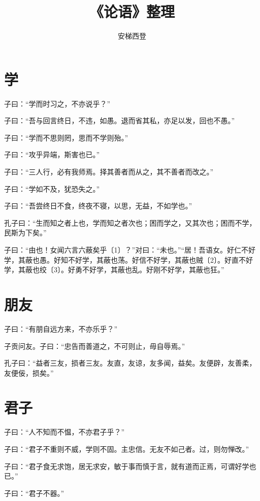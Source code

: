 \documentclass[a5paper]{ctexbook}
\title{《论语》整理}
\author{安梯西登}
\date{}
\begin{document}
    \maketitle

    \tableofcontents

    \chapter{学}

    子曰：“学而时习之，不亦说乎？”

    子曰：“吾与回言终日，不违，如愚。退而省其私，亦足以发，回也不愚。”

    子曰：“学而不思则罔，思而不学则殆。”

    子曰：“攻乎异端，斯害也已。”

    子曰：“三人行，必有我师焉。择其善者而从之，其不善者而改之。”

    子曰：“学如不及，犹恐失之。”

    子曰：“吾尝终日不食，终夜不寝，以思，无益，不如学也。”

    孔子曰：“生而知之者上也，学而知之者次也；困而学之，又其次也；困而不学，民斯为下矣。”

    子曰：“由也！女闻六言六蔽矣乎〔1〕？”对曰：“未也。”“居！吾语女。好仁不好学，其蔽也愚。好知不好学，其蔽也荡。好信不好学，其蔽也贼〔2〕。好直不好学，其蔽也绞〔3〕。好勇不好学，其蔽也乱。好刚不好学，其蔽也狂。”

    \chapter{朋友}

    子曰：“有朋自远方来，不亦乐乎？”

    子贡问友。子曰：“忠告而善道之，不可则止，毋自辱焉。”

    孔子曰：“益者三友，损者三友。友直，友谅，友多闻，益矣。友便辟，友善柔，友便佞，损矣。”

    \chapter{君子}
    
    子曰：“人不知而不愠，不亦君子乎？”

    子曰：“君子不重则不威，学则不固。主忠信。无友不如己者。过，则勿惮改。”

    子曰：“君子食无求饱，居无求安，敏于事而慎于言，就有道而正焉，可谓好学也已。”

    子曰：“君子不器。”
    
\end{document}
